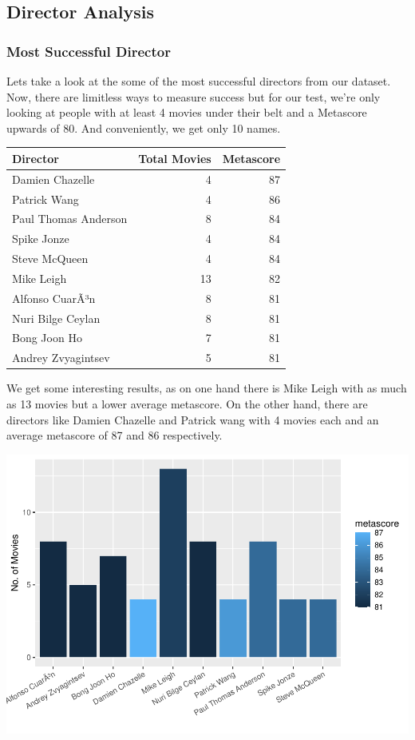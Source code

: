 \documentclass[11pt,a4paper,]{article}
\begin{document}
\hypertarget{director-analysis}{%
\subsection{Director Analysis}\label{director-analysis}}

\hypertarget{most-successful-director}{%
\subsubsection{Most Successful Director}\label{most-successful-director}}

Lets take a look at the some of the most successful directors from our dataset. Now, there are limitless ways to measure success but for our test, we're only looking at people with at least 4 movies under their belt and a Metascore upwards of 80. And conveniently, we get only 10 names.

\begin{table}[H]
\centering
\begin{tabular}{l|r|r}
\hline
Director & Total Movies & Metascore\\
\hline
Damien Chazelle & 4 & 87\\
\hline
Patrick Wang & 4 & 86\\
\hline
Paul Thomas Anderson & 8 & 84\\
\hline
Spike Jonze & 4 & 84\\
\hline
Steve McQueen & 4 & 84\\
\hline
Mike Leigh & 13 & 82\\
\hline
Alfonso CuarÃ³n & 8 & 81\\
\hline
Nuri Bilge Ceylan & 8 & 81\\
\hline
Bong Joon Ho & 7 & 81\\
\hline
Andrey Zvyagintsev & 5 & 81\\
\hline
\end{tabular}
\end{table}

We get some interesting results, as on one hand there is Mike Leigh with as much as 13 movies but a lower average metascore. On the other hand, there are directors like Damien Chazelle and Patrick wang with 4 movies each and an average metascore of 87 and 86 respectively.

\includegraphics{Report_files/figure-latex/2-1.pdf}
\end{document}
